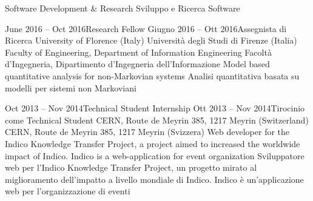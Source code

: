 
\newcommand{\cvLanguage}{english}

\newcommand{\courses}{true}
\newcommand{\projects}{true}
\newcommand{\signature}{false}
\newcommand{\urls}{true}
\newcommand{\publications}{true}




  \begin{europasscv}
    
    
    
    \ecvpersonalinfo
    
    \addJobAppliedFor
      {Software Development \& Research}
      {Sviluppo e Ricerca Software}
    
    \workExperience
      
      \addJob
      {June 2016 -- Oct 2016}{Research Fellow}
      {Giugno 2016 -- Ott 2016}{Assegnista di Ricerca}
        \addItem
          {University of Florence (Italy)}
          {Università degli Studi di Firenze (Italia)}
        \addItem
          {Faculty of Engineering, Department of Information Engineering}
          {Facoltà d'Ingegneria, Dipartimento d'Ingegneria dell'Informazione}
        \addItem
          {Model based quantitative analysis for non-Markovian systems}
          {Analisi quantitativa basata su modelli per sistemi non Markoviani}
      
      \addJob
      {Oct 2013 -- Nov 2014}{Technical Student Internship}
      {Ott 2013 -- Nov 2014}{Tirocinio come Technical Student}
        \addItem
          {CERN, Route de Meyrin 385, 1217 Meyrin (Switzerland)}
          {CERN, Route de Meyrin 385, 1217 Meyrin (Svizzera)}
        \addItem
          {Web developer for the Indico Knowledge Transfer Project, a project aimed to increased the worldwide impact of Indico. Indico is a web-application for event organization}
          {Sviluppatore web per l'Indico Knowledge Transfer Project, un progetto mirato al miglioramento dell'impatto a livello mondiale di Indico. Indico è un'applicazione web per l'organizzazione di eventi}
    

\end{europasscv}

